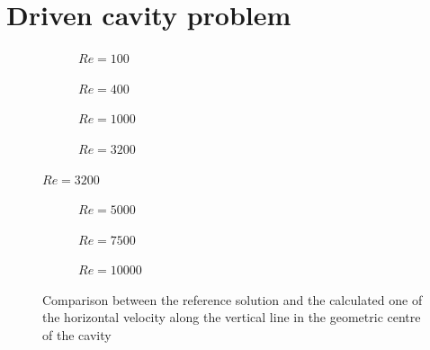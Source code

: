 \chapter{Driven cavity problem}

\begin{figure}[h]
	\centering
	\begin{subfigure}{0.5\textwidth}
		\resizebox{1.4\textwidth}{!}{}
		\caption{$Re=100$}
	\end{subfigure}%
	\begin{subfigure}{0.5\textwidth}
		\resizebox{1.4\textwidth}{!}{}
		\caption{$Re=400$}
	\end{subfigure}
	\begin{subfigure}{0.5\textwidth}
		\resizebox{1.4\textwidth}{!}{}
		\caption{$Re=1000$}
	\end{subfigure}%
	\begin{subfigure}{0.5\textwidth}
		\resizebox{1.4\textwidth}{!}{}
		\caption{$Re=3200$}
	\end{subfigure}
\end{figure}
\begin{figure}\ContinuedFloat
	\begin{subfigure}{0.5\textwidth}
		\resizebox{1.4\textwidth}{!}{}
		\caption{$Re=5000$}
	\end{subfigure}%
	\begin{subfigure}{0.5\textwidth}
		\resizebox{1.4\textwidth}{!}{}
		\caption{$Re=7500$}
	\end{subfigure}
	\begin{subfigure}{0.5\textwidth}
		\center
		\resizebox{1.4\textwidth}{!}{}
		\caption{$Re=10000$}
	\end{subfigure}
	\caption[Comparison between the reference solution and the calculated one of the horizontal velocity along the vertical line in the geometric center of the cavity]{Comparison between the reference solution and the calculated one of the horizontal velocity along the vertical line in the geometric centre of the cavity \cite{Ghia1982}}
\end{figure}


